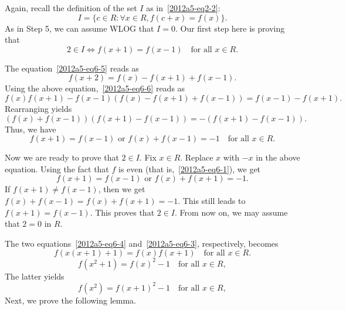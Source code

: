 \documentclass{article}
\begin{document}
Again, recall the definition of the set $I$ as in~\eqref{2012a5-eq2-2}:
\[ I = \{c \in R : \forall x \in R, f(c + x) = f(x)\}. \]
As in Step 5, we can assume WLOG that $I = 0$.
Our first step here is proving that
\[ 2 \in I \iff f(x + 1) = f(x - 1) \quad \text{for all } x \in R. \]

The equation~\eqref{2012a5-eq6-5} reads as
\[ f(x + 2) = f(x) - f(x + 1) + f(x - 1). \]
Using the above equation,~\eqref{2012a5-eq6-6} reads as
\[ f(x) f(x + 1) - f(x - 1) (f(x) - f(x + 1) + f(x - 1)) = f(x - 1) - f(x + 1). \]
Rearranging yields
\[ (f(x) + f(x - 1))(f(x + 1) - f(x - 1)) = -(f(x + 1) - f(x - 1)). \]
Thus, we have
\[ f(x + 1) = f(x - 1) \text{ or } f(x) + f(x - 1) = -1 \quad \text{for all } x \in R. \]

Now we are ready to prove that $2 \in I$.
Fix $x \in R$.
Replace $x$ with $-x$ in the above equation.
Using the fact that $f$ is even (that is,~\eqref{2012a5-eq6-1}), we get
\[ f(x + 1) = f(x - 1) \text{ or } f(x) + f(x + 1) = -1. \]
If $f(x + 1) \neq f(x - 1)$, then we get $f(x) + f(x - 1) = f(x) + f(x + 1) = -1$.
This still leads to $f(x + 1) = f(x - 1)$.
This proves that $2 \in I$.
From now on, we may assume that $2 = 0$ in $R$.

The two equations~\eqref{2012a5-eq6-4} and~\eqref{2012a5-eq6-3}, respectively, becomes
\[ f(x(x + 1) + 1) = f(x) f(x + 1) \quad \text{for all } x \in R. \tag{10.1}\label{2012a5-eq10-1} \]
\[ f(x^2 + 1) = f(x)^2 - 1 \quad \text{for all } x \in R, \tag{10.2}\label{2012a5-eq10-2} \]
The latter yields
\[ f(x^2) = f(x + 1)^2 - 1  \quad \text{for all } x \in R, \tag{10.3}\label{2012a5-eq10-3} \]
Next, we prove the following lemma.
\end{document}
